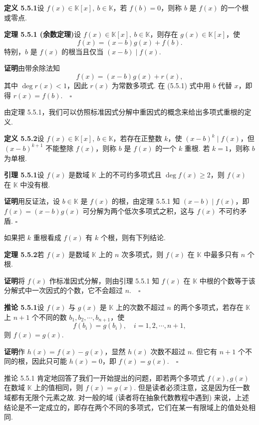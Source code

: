 \documentclass[UTF8,12pt,a4paper,fontset=fandol]{ctexart}
\begin{document}
\noindent\textbf{定义 5.5.1}\quad 设 $f(x)\in\mathbb{K}[x],\ b\in\mathbb{K}$，若 $f(b)=0$，则称 $b$ 是 $f(x)$ 的一个根或零点.

\noindent\textbf{定理 5.5.1 (余数定理)}\quad 设 $f(x)\in\mathbb{K}[x],\ b\in\mathbb{K}$，则存在 $g(x)\in\mathbb{K}[x]$，使
\[
f(x)=(x-b)g(x)+f(b).
\]
特别，$b$ 是 $f(x)$ 的根当且仅当 $(x-b)\mid f(x)$.

\noindent\textbf{证明}\quad 由带余除法知
\begin{equation}
f(x)=(x-b)g(x)+r(x),
\tag{5.5.1}
\end{equation}
其中 $\deg r(x)<1$，因此 $r(x)$ 为常数多项式. 在 (5.5.1) 式中用 $b$ 代替 $x$，即得 $r(x)=f(b).\quad \square$

由定理 5.5.1，我们可以仿照标准因式分解中重因式的概念来给出多项式重根的定义.

\noindent\textbf{定义 5.5.2}\quad 设 $f(x)\in\mathbb{K}[x],\ b\in\mathbb{K}$，若存在正整数 $k$，使 $(x-b)^k\mid f(x)$，但 $(x-b)^{k+1}$ 不能整除 $f(x)$，则称 $b$ 是 $f(x)$ 的一个 $k$ 重根. 若 $k=1$，则称 $b$ 为单根.

\noindent\textbf{引理 5.5.1}\quad 设 $f(x)$ 是数域 $\mathbb{K}$ 上的不可约多项式且 $\deg f(x)\geq 2$，则 $f(x)$ 在 $\mathbb{K}$ 中没有根.

\noindent\textbf{证明}\quad 用反证法，设 $b\in\mathbb{K}$ 是 $f(x)$ 的根，由定理 5.5.1 知 $(x-b)\mid f(x)$，即 $f(x)=(x-b)g(x)$ 可分解为两个低次多项式之积，这与 $f(x)$ 不可约矛盾. $\square$

如果把 $k$ 重根看成 $f(x)$ 有 $k$ 个根，则有下列结论.

\noindent\textbf{定理 5.5.2}\quad 若 $f(x)$ 是数域 $\mathbb{K}$ 上的 $n$ 次多项式，则 $f(x)$ 在 $\mathbb{K}$ 中最多只有 $n$ 个根.

\noindent\textbf{证明}\quad 将 $f(x)$ 作标准因式分解，则由引理 5.5.1 知 $f(x)$ 在 $\mathbb{K}$ 中根的个数等于该分解式中一次因式的个数，它不会超过 $n.\quad \square$

\noindent\textbf{推论 5.5.1}\quad 设 $f(x)$ 与 $g(x)$ 是 $\mathbb{K}$ 上的次数不超过 $n$ 的两个多项式，若存在 $\mathbb{K}$ 上 $n+1$ 个不同的数 $b_1,b_2,\cdots,b_{n+1}$，使
\[
f(b_i)=g(b_i),\quad i=1,2,\cdots,n+1,
\]
则 $f(x)=g(x)$.

\noindent\textbf{证明}\quad 作 $h(x)=f(x)-g(x)$，显然 $h(x)$ 次数不超过 $n$. 但它有 $n+1$ 个不同的根，因此只可能 $h(x)=0$，即 $f(x)=g(x).\quad \square$

推论 5.5.1 肯定地回答了我们一开始提出的问题，即若两个多项式 $f(x),g(x)$ 在数域 $\mathbb{K}$ 上的值相同，则 $f(x)=g(x)$. 但是读者必须注意，这是因为任一数域都有无限个元素之故. 对一般的域 (读者将在抽象代数教程中遇到) 来说，上述结论是不一定成立的，即存在两个不同的多项式，它们在某一有限域上的值处处相同.
\end{document}
